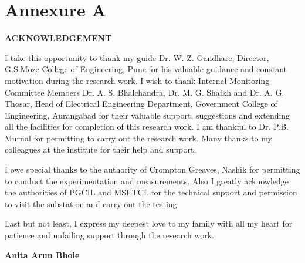 
\chapter*{Annexure A}

\clearpage


\begin{center}
\large \textbf{ACKNOWLEDGEMENT}
\end{center}

\setlength{\parskip}{1em}
\justify \normalsize I take this opportunity to thank my guide Dr. W. Z. Gandhare, Director, G.S.Moze College of Engineering, Pune for his valuable guidance and constant motivation during the research work. I wish to thank Internal Monitoring Committee Members Dr. A. S. Bhalchandra, Dr. M. G. Shaikh and Dr. A. G. Thosar, Head of Electrical Engineering Department, Government College of Engineering, Aurangabad for their valuable support, suggestions and extending all the facilities for completion of this research work. I am thankful to Dr. P.B. Murnal for permitting to carry out the research work. Many thanks to my colleagues at the institute for their help and support.

I owe special thanks to the authority of Crompton Greaves, Nashik for permitting to conduct the experimentation and measurements. Also I greatly acknowledge the authorities of PGCIL and MSETCL for the technical support and permission to visit the substation and carry out the testing.

Last but not least, I express my deepest love to my family with all my heart for patience and unfailing support through the research work.

\setlength{\parskip}{0em}
\vspace{2cm}
\begin{flushright}
\textbf{Anita Arun Bhole}
\end{flushright}
\clearpage